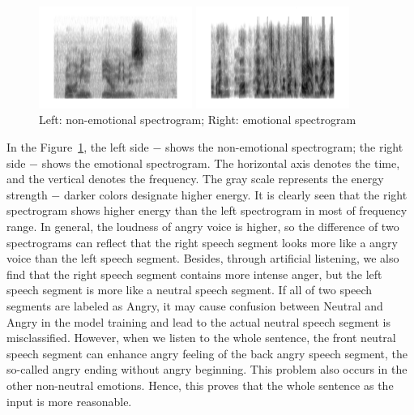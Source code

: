 \documentclass[a4paper]{article}
\begin{document}
\begin{figure}[htb]
\begin{minipage}[b]{.48\linewidth}
  \centering
  \centerline{\includegraphics[width=5.0cm]{neu}}
\end{minipage}
\hfill
\begin{minipage}[b]{0.48\linewidth}
  \centering
  \centerline{\includegraphics[width=5.0cm]{ang}}
\end{minipage}
%
\caption{Left: non-emotional spectrogram; Right: emotional spectrogram}
\label{fig:spectrogram}
\end{figure}

In the Figure~\ref{fig:spectrogram}, the left side $-$ shows the non-emotional spectrogram; the right side $-$ shows the emotional spectrogram. The horizontal axis denotes the time, and the vertical denotes the frequency. The gray scale represents the energy strength $-$ darker colors designate higher energy. It is clearly seen that the right spectrogram shows higher energy than the left spectrogram in most of frequency range. In general, the loudness of angry voice is higher, so the difference of two spectrograms can reflect that the right speech segment looks more like a angry voice than the left speech segment. Besides, through artificial listening, we also find that the right speech segment contains more intense anger, but the left speech segment is more like a neutral speech segment. If all of two speech segments are labeled as Angry, it may cause confusion between Neutral and Angry in the model training and lead to the actual neutral speech segment is misclassified. However, when we listen to the whole sentence, the front neutral speech segment can enhance angry feeling of the back angry speech segment, the so-called angry ending without angry beginning. This problem also occurs in the other non-neutral emotions. Hence, this proves that the whole sentence as the input is more reasonable.
\end{document}

